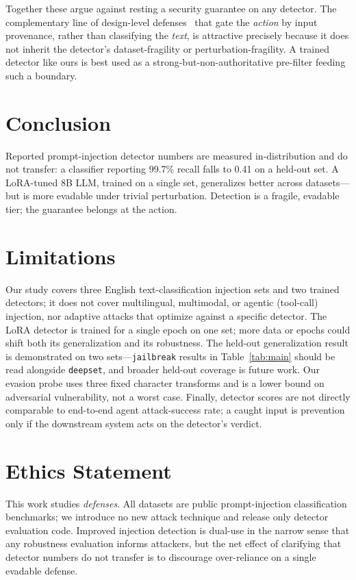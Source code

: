 \documentclass[11pt]{article}
\begin{document}
Together these argue against resting a security guarantee on any detector. The complementary line of
design-level defenses~\citep{camel,progent,fides} that gate the \emph{action} by input provenance,
rather than classifying the \emph{text}, is attractive precisely because it does not inherit the
detector's dataset-fragility or perturbation-fragility. A trained detector like ours is best used as
a strong-but-non-authoritative pre-filter feeding such a boundary.

\section{Conclusion}
Reported prompt-injection detector numbers are measured in-distribution and do not transfer: a
classifier reporting 99.7\% recall falls to 0.41 on a held-out set. A LoRA-tuned 8B LLM,
trained on a single set, generalizes better across datasets---but is more evadable under trivial
perturbation. Detection is a fragile, evadable tier; the guarantee belongs at the action.

\section*{Limitations}
Our study covers three English text-classification injection sets and two trained detectors; it does
not cover multilingual, multimodal, or agentic (tool-call) injection, nor adaptive attacks that
optimize against a specific detector. The LoRA detector is trained for a single epoch on one set;
more data or epochs could shift both its generalization and its robustness. The held-out
generalization result is demonstrated on two sets---\texttt{jailbreak} results in
Table~\ref{tab:main} should be read alongside \texttt{deepset}, and broader held-out coverage is
future work. Our evasion probe uses three fixed character transforms and is a lower bound on
adversarial vulnerability, not a worst case. Finally, detector scores are not directly comparable to
end-to-end agent attack-success rate; a caught input is prevention only if the downstream system
acts on the detector's verdict.

\section*{Ethics Statement}
This work studies \emph{defenses}. All datasets are public prompt-injection classification
benchmarks; we introduce no new attack technique and release only detector evaluation code. Improved
injection detection is dual-use in the narrow sense that any robustness evaluation informs attackers,
but the net effect of clarifying that detector numbers do not transfer is to discourage
over-reliance on a single evadable defense.



\end{document}
